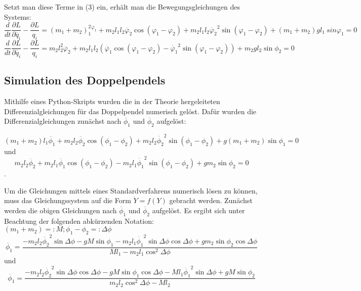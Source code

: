 Setzt man diese Terme in (3) ein, erhält man die Bewegungsgleichungen des Systems:
\begin{equation}
\frac{d}{dt}\frac{\partial L}{\partial\dot{q_i}}-\frac{\partial L}{q_i} = (m_1 + m_2) _1^2^\ddot{\varphi_1} + m_2 l_1 l_2 \ddot{\varphi_2} \cos (\varphi_1 - \varphi_2) + m_2 l_1 l_2 \dot{\varphi_2}^2 \sin (\varphi_1 - \varphi_2) + (m_1 + m_2) g l_1 \ sin \varphi_1 = 0
\end{equation}
\begin{equation}
\frac{d}{dt}\frac{\partial L}{\partial\dot{q_i}}-\frac{\partial L}{q_i} = m_2 l_2^2 \ddot{\varphi_2} + m_2 l_1 l_2 (\ddot{\varphi_1} \cos (\varphi_1 - \varphi_2) - \dot{\varphi_1}^2 \sin (\varphi_1 - \varphi_2)) + m_2 g l_2 \sin \phi_2 = 0
\end{equation}


\subsection{Simulation des Doppelpendels}
Mithilfe eines Python-Skripts wurden die in der Theorie hergeleiteten Differenzialgleichungen für das Doppelpendel numerisch gelöst. Dafür wurden die Differenzialgleichungen zunächst nach $ \ddot{\phi_1} $ und $\ddot{\phi_2} $ aufgelöst: 

\begin{equation}
(m_1 + m_2) l_1 \ddot{\phi_1}  + m_2 l_2 \ddot{\phi_2} \cos{(\phi_1 - \phi_2)} + m_2 l_2 \dot{\phi_2}^{2} \sin{(\phi_1 - \phi_2)} + g (m_1 + m_2) \sin{\phi_1} = 0
\end{equation} 
und
\begin{equation}
m_2 l_2 \ddot{\phi_2} + m_2 l_1 \ddot{\phi_1} \cos{(\phi_1 - \phi_2)} - m_2 l_1 \dot{\phi_1}^{2} \sin{(\phi_1 - \phi_2)} + g m_2 \sin{\phi_2} = 0
\end{equation}
. 

Um die Gleichungen mittels eines Standardverfahrens numerisch lösen zu können, muss das Gleichungssystem auf die Form $ \dot{Y} = f(Y) $ gebracht werden. Zunächst werden die obigen Gleichungen nach $ \ddot{\phi_1} $ und $ \ddot{\phi_2} $ aufgelöst. Es ergibt sich unter Beachtung der folgenden abkürzenden Notation: 
$ (m_1 + m_2) =: M; \phi_1 - \phi_2 =: \Delta \phi $
\begin{equation}
\ddot{\phi_1} = \frac{-m_2 l_2 \dot{\phi_2}^{2} \sin{\Delta \phi} - g M \sin{\phi_1} - m_2 l_1 \dot{\phi_1}^{2} \sin{\Delta \phi} \cos{\Delta \phi} + g m_2 \sin{\phi_2}\cos{\Delta  \phi}}{M l_1 - m_2 l_1 \cos^{2}{\Delta \phi}}
\end{equation}
und
\begin{equation} 
\ddot{\phi_1} = \frac{-m_2 l_2 \dot{\phi_2}^{2} \sin{\Delta \phi} \cos{\Delta \phi} - g M \sin{\phi_1} \cos{\Delta \phi} - M l_1 \dot{\phi_1}^{2} \sin{\Delta \phi} + g M \sin{\phi_2}}{m_2 l_2 \cos^{2}{\Delta \phi} - M l_2}
\end{equation}

